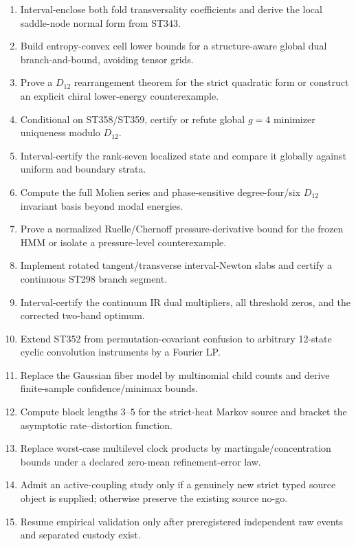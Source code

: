 \documentclass[11pt,a4paper]{article}
\begin{document}
\begin{enumerate}
\item[\textbf{ST357}.] Interval-enclose both fold transversality coefficients and derive the local saddle-node normal form from ST343.
\item[\textbf{ST358}.] Build entropy-convex cell lower bounds for a structure-aware global dual branch-and-bound, avoiding tensor grids.
\item[\textbf{ST359}.] Prove a $D_{12}$ rearrangement theorem for the strict quadratic form or construct an explicit chiral lower-energy counterexample.
\item[\textbf{ST360}.] Conditional on ST358/ST359, certify or refute global $g=4$ minimizer uniqueness modulo $D_{12}$.
\item[\textbf{ST361}.] Interval-certify the rank-seven localized state and compare it globally against uniform and boundary strata.
\item[\textbf{ST362}.] Compute the full Molien series and phase-sensitive degree-four/six $D_{12}$ invariant basis beyond modal energies.
\item[\textbf{ST363}.] Prove a normalized Ruelle/Chernoff pressure-derivative bound for the frozen HMM or isolate a pressure-level counterexample.
\item[\textbf{ST364}.] Implement rotated tangent/transverse interval-Newton slabs and certify a continuous ST298 branch segment.
\item[\textbf{ST365}.] Interval-certify the continuum IR dual multipliers, all threshold zeros, and the corrected two-band optimum.
\item[\textbf{ST366}.] Extend ST352 from permutation-covariant confusion to arbitrary 12-state cyclic convolution instruments by a Fourier LP.
\item[\textbf{ST367}.] Replace the Gaussian fiber model by multinomial child counts and derive finite-sample confidence/minimax bounds.
\item[\textbf{ST368}.] Compute block lengths $3$--$5$ for the strict-heat Markov source and bracket the asymptotic rate--distortion function.
\item[\textbf{ST369}.] Replace worst-case multilevel clock products by martingale/concentration bounds under a declared zero-mean refinement-error law.
\item[\textbf{ST370}.] Admit an active-coupling study only if a genuinely new strict typed source object is supplied; otherwise preserve the existing source no-go.
\item[\textbf{ST371}.] Resume empirical validation only after preregistered independent raw events and separated custody exist.
\end{enumerate}
\end{document}
